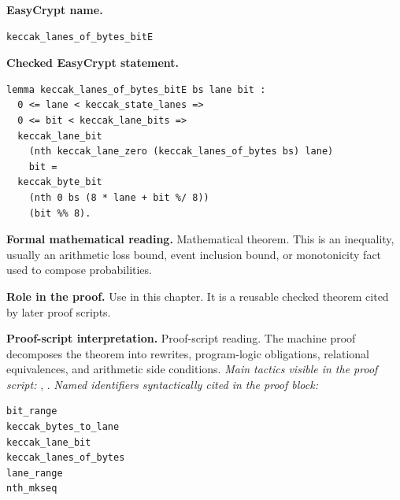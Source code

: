 \begin{formaltheorem}
\noindent\textbf{EasyCrypt name.}
\begin{lstlisting}[language=EasyCrypt,basicstyle=\ttfamily\scriptsize]
keccak_lanes_of_bytes_bitE
\end{lstlisting}
\noindent\textbf{Checked EasyCrypt statement.}
\begin{lstlisting}[language=EasyCrypt,basicstyle=\ttfamily\scriptsize]
lemma keccak_lanes_of_bytes_bitE bs lane bit :
  0 <= lane < keccak_state_lanes =>
  0 <= bit < keccak_lane_bits =>
  keccak_lane_bit
    (nth keccak_lane_zero (keccak_lanes_of_bytes bs) lane)
    bit =
  keccak_byte_bit
    (nth 0 bs (8 * lane + bit %/ 8))
    (bit %% 8).
\end{lstlisting}
\noindent\textbf{Formal mathematical reading.}
Mathematical theorem. This is an inequality, usually an arithmetic loss bound, event inclusion bound, or monotonicity fact used to compose probabilities.

\noindent\textbf{Role in the proof.}
Use in this chapter. It is a reusable checked theorem cited by later proof scripts.

\noindent\textbf{Proof-script interpretation.}
Proof-script reading. The machine proof decomposes the theorem into rewrites, program-logic obligations, relational equivalences, and arithmetic side conditions.
\emph{Main tactics visible in the proof script:} , .
\emph{Named identifiers syntactically cited in the proof block:}
\begin{lstlisting}[language=EasyCrypt,basicstyle=\ttfamily\scriptsize]
bit_range
keccak_bytes_to_lane
keccak_lane_bit
keccak_lanes_of_bytes
lane_range
nth_mkseq
\end{lstlisting}

\end{formaltheorem}


